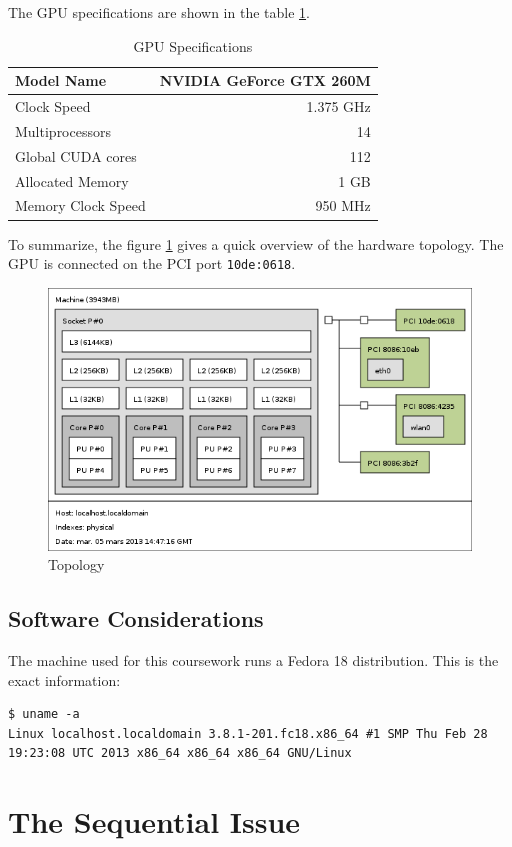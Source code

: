 \documentclass[fleqn,10pt]{SelfArx} %
\begin{document}
The GPU specifications are shown in the table \ref{GPUspecs}.

\begin{table}[h]
\centering
\begin{tabular}{|l|r|}
\hline
Model Name & NVIDIA GeForce GTX 260M \\
\hline
Clock Speed & 1.375 GHz \\
\hline
Multiprocessors & 14 \\
\hline
Global CUDA cores & 112 \\
\hline
Allocated Memory & 1 GB \\
\hline
Memory Clock Speed & 950 MHz \\
\hline
\end{tabular}
\caption{GPU Specifications}
\label{GPUspecs}
\end{table}

To summarize, the figure \ref{topo} gives a quick overview of the hardware topology. The GPU is connected on the PCI port \verb+10de:0618+.

\begin{figure}[h]
\centering
\includegraphics[width=.48\textwidth]{topo.png}
\caption{Topology}
\label{topo}
\end{figure}

\subsection{Software Considerations}

The machine used for this coursework runs a Fedora 18 distribution. This is the exact information:
\begin{lstlisting}
$ uname -a
Linux localhost.localdomain 3.8.1-201.fc18.x86_64 #1 SMP Thu Feb 28 19:23:08 UTC 2013 x86_64 x86_64 x86_64 GNU/Linux
\end{lstlisting}



\section{The Sequential Issue}
\end{document}

